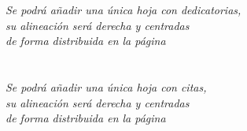 
\chapter*{}
\setlength{\leftmargin}{0.5\textwidth}
\setlength{\parsep}{0cm}
\addtolength{\topsep}{0.5cm}
\begin{flushright}
\small\em{
Se podrá añadir una única hoja con dedicatorias,\\
su alineación será derecha y centradas\\
de forma distribuida en la página
}
\end{flushright}


\chapter*{}
\setlength{\leftmargin}{0.5\textwidth}
\setlength{\parsep}{0cm}
\addtolength{\topsep}{0.5cm}
\begin{flushright}
\small\em{
Se podrá añadir una única hoja con citas,\\
su alineación será derecha y centradas\\
de forma distribuida en la página
}
\end{flushright}
